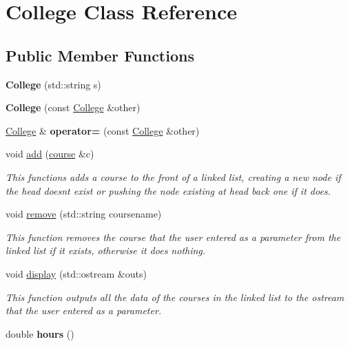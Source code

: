 \hypertarget{classCollege}{}\section{College Class Reference}
\label{classCollege}
\subsection*{Public Member Functions}
\begin{DoxyCompactItemize}
\item 
{\bfseries College} (std\+::string s)\hypertarget{classCollege_adabaf4087355e83f9f7d39f1e1498b41}{}\label{classCollege_adabaf4087355e83f9f7d39f1e1498b41}

\item 
{\bfseries College} (const \hyperlink{classCollege}{College} \&other)\hypertarget{classCollege_ad007ad488e5a7ef986114080d0c8e101}{}\label{classCollege_ad007ad488e5a7ef986114080d0c8e101}

\item 
\hyperlink{classCollege}{College} \& {\bfseries operator=} (const \hyperlink{classCollege}{College} \&other)\hypertarget{classCollege_af2194c9b37f80d13dc3fdba6784b18e8}{}\label{classCollege_af2194c9b37f80d13dc3fdba6784b18e8}

\item 
void \hyperlink{classCollege_a67fd1d8970b46b24ce2e0dd72598a22f}{add} (\hyperlink{classcourse}{course} \&c)
\begin{DoxyCompactList}\small\item\em This functions adds a course to the front of a linked list, creating a new node if the head doesn\textquotesingle{}t exist or pushing the node existing at head back one if it does. \end{DoxyCompactList}\item 
void \hyperlink{classCollege_a4d2ae513b36e6421fb1ca2c08459cfe6}{remove} (std\+::string coursename)
\begin{DoxyCompactList}\small\item\em This function removes the course that the user entered as a parameter from the linked list if it exists, otherwise it does nothing. \end{DoxyCompactList}\item 
void \hyperlink{classCollege_a52ca0a164483cf5c05591cd0fb8b300c}{display} (std\+::ostream \&outs)
\begin{DoxyCompactList}\small\item\em This function outputs all the data of the courses in the linked list to the ostream that the user entered as a parameter. \end{DoxyCompactList}\item 
double {\bfseries hours} ()\hypertarget{classCollege_a8a7a762611a1d7e00c453390d49355fd}{}\label{classCollege_a8a7a762611a1d7e00c453390d49355fd}


\end{DoxyCompactItemize}

